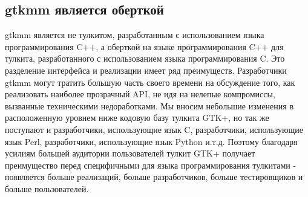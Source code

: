 \subsection{gtkmm является оберткой}
gtkmm является не тулкитом, разработанным с использованием языка программирования C++, а оберткой на языке программирования C++ для тулкита, разработанного с использованием языка программирования C. Это разделение интерфейса и реализации имеет ряд преимуществ. Разработчики gtkmm могут тратить большую часть своего времени на обсуждение того, как реализовать наиболее прозрачный API, не идя на нелепые компромиссы, вызванные техническими недоработками. Мы вносим небольшие изменения в расположенную уровнем ниже кодовую базу тулкита GTK+, но так же поступают и разработчики, использующие язык C, разработчики, использующие язык Perl, разработчики, использующие язык Python и.т.д. Поэтому благодаря усилиям большей аудитории пользователей тулкит GTK+ получает преимущество перед специфичными для языка программирования тулкитами - появляется больше реализаций, больше разработчиков, больше тестировщиков и больше пользователей. 

